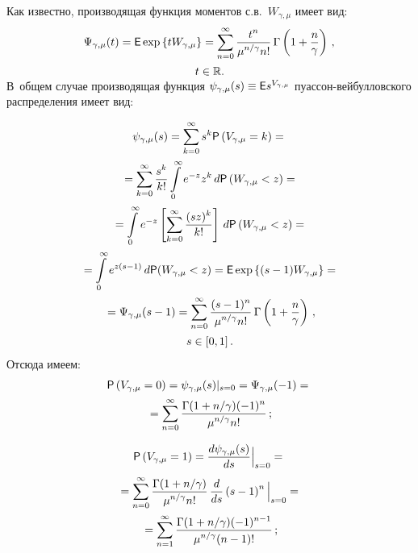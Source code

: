 \begin{multicols}{2}
\smallskip

Как известно, производящая функция моментов с.в.~$W_{\gamma,\mu}$
имеет вид:
\begin{multline*}
\hspace*{-1.18353pt}\Psi_{\gamma,\mu}(t)={\sf E}
\exp\left\{tW_{\gamma,\mu}\right\}=
\sum\limits_{n=0}^{\infty}\fr{t^n}{\mu^{n/\gamma}n!}\,\Gamma
\left(1+\fr{n}{\gamma}\right)\,,\\[1pt]
t\in\mathbb{R}.
\vspace*{-12pt}
\end{multline*}


\noindent
В~общем случае производящая функция $\psi_{\gamma,\mu}(s)\hm \equiv 
{\sf E}s^{V_{\gamma,\mu}}$ пуас\-сон-вей\-бул\-лов\-ско\-го распределения имеет вид:

\noindent
\begin{multline*}
\psi_{\gamma,\mu}(s)=\sum\limits_{k=0}^{\infty}s^k{\sf P}
\left(V_{\gamma,\mu}=k\right)={}\\[1pt]
{}=\sum\limits_{k=0}^{\infty}
\displaystyle\frac{\displaystyle s^k\mathstrut}{\displaystyle k!\mathstrut}\int\limits_{0}^{\infty}e^{-z}z^k\,d{\sf P}
\left(W_{\gamma,\mu}<z\right)={}\\[1pt]
{}=\int\limits_{0}^{\infty}
e^{-z}\left[\sum\limits_{k=0}^{\infty}\displaystyle\frac{\displaystyle (sz)^k\mathstrut}{\displaystyle k!\mathstrut}\right]\,d{\sf P}
\left(W_{\gamma,\mu}<z\right)= {}\\[1pt]
{}=\int\limits_{0}^{\infty}e^{z(s-1)}\,d{\sf P}(W_{\gamma,\mu}<z)={\sf E}
\exp\left\{(s-1)W_{\gamma,\mu}\right\}={}\\[1pt]
{}=
\Psi_{\gamma,\mu}(s-1)=\sum\limits_{n=0}^{\infty}\displaystyle\frac{\displaystyle (s-1)^n\mathstrut}{\displaystyle \mu^{n/\gamma}n!\mathstrut}\,
\Gamma\left(1+\displaystyle\frac{\displaystyle n\mathstrut}{\displaystyle \gamma\mathstrut}\right)\,,\\[1pt]
 s\in[0,1]\,.
\end{multline*}
Отсюда имеем:
\begin{multline*}
{\sf P}\left(V_{\gamma,\mu}=0\right)=
\psi_{\gamma,\mu}(s)|_{s=0}=\Psi_{\gamma,\mu}(-1)={}\\[1pt]
{}=
\sum\limits_{n=0}^{\infty}\displaystyle\frac{\displaystyle \Gamma(1+{n}/{\gamma})(-1)^n\mathstrut}{\displaystyle \mu^{n/\gamma}n!\mathstrut}\,;
\end{multline*}

\vspace*{-12pt}

\begin{multline*}
{\sf P}\left(V_{\gamma,\mu}=1\right)=
\displaystyle\frac{\displaystyle d\psi_{\gamma,\mu}(s)\mathstrut}{\displaystyle ds\mathstrut}\Big|_{s=0}={}\\[1pt]
{}=
\sum\limits_{n=0}^{\infty}\displaystyle\frac{\displaystyle \Gamma(1+{n}/{\gamma})\mathstrut}{\displaystyle \mu^{n/\gamma}n!\mathstrut}\,
\displaystyle\frac{\displaystyle d\mathstrut}{\displaystyle ds\mathstrut}\left(s-1\right)^n\Big|_{s=0}={}\\[1pt]
{}=
\sum\limits_{n=1}^{\infty}\displaystyle\frac{\displaystyle \Gamma(1+{n}/{\gamma})(-1)^{n-1}\mathstrut}{\displaystyle \mu^{n/\gamma}(n-1)!\mathstrut}\,;
\end{multline*}


\end{multicols}
